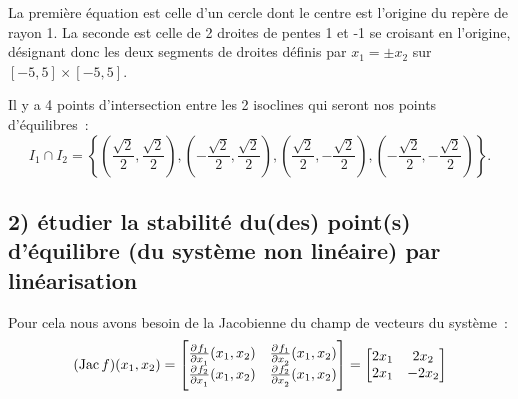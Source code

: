 \documentclass[11pt,a4paper]{report}
\newcommand{\rac}{\ensuremath{\frac{\sqrt{2}}{2}}}
\DeclareMathOperator{\Jac}{Jac}
\begin{document}
			La première équation est celle d'un cercle dont le centre est l'origine du repère de rayon 1. La seconde est celle de 2 droites de pentes 1 et -1 se croisant en l'origine, désignant donc
			les deux segments de droites définis par $x_1 = \pm x_2$ sur $[-5, 5] \times [-5, 5]$.

			Il y a 4 points d'intersection entre les 2 isoclines qui seront nos points d'équilibres~:
			\[
				I_1 \cap I_2 = \left\{\left( \rac , \rac\right), \left( -\rac , \rac\right), \left(\rac , -\rac\right), \left(-\rac , -\rac\right)\right\}.
			\]

		\subsection*{2) étudier la stabilité du(des) point(s) d'équilibre (du système non linéaire) par linéarisation}

			Pour cela nous avons besoin de la Jacobienne du champ de vecteurs du système~:
			\[
				(\Jac f)(x_1, x_2)
				=
				\begin{bmatrix}
			   	\pd {f_1}{x_1}(x_1, x_2) & \pd {f_1}{x_2}(x_1, x_2) \\
			   	\pd {f_2}{x_1}(x_1, x_2) & \pd {f_2}{x_2}(x_1, x_2)
				\end{bmatrix}
				=
				\begin{bmatrix}
			   	2x_1 & 2x_2 \\
			   	2x_1 & -2x_2
				\end{bmatrix}
			\]
\end{document}

